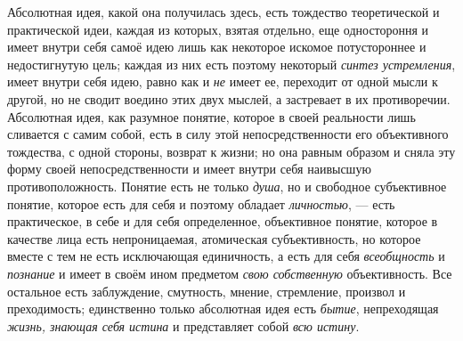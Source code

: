 \documentclass[twoside]{article}
\begin{document}
Абсолютная идея, какой она получилась здесь, есть тождество
теоретической и практической идеи, каждая из которых, взятая отдельно, еще
одностороння и имеет внутри себя самоё идею лишь как некоторое искомое
потустороннее и недостигнутую цель; каждая из них есть поэтому некоторый
{\em синтез устремления},
имеет внутри себя идею, равно как и
{\em не} имеет ее,
переходит от одной мысли к другой, но не сводит воедино этих двух мыслей, а
застревает в их противоречии. Абсолютная идея, как разумное понятие,
которое в своей реальности лишь сливается с самим собой, есть в силу этой
непосредственности его объективного тождества, с одной стороны, возврат к
жизни; но она равным образом и сняла эту форму своей непосредственности и
имеет внутри себя наивысшую противоположность. Понятие есть не только
{\em душа}, но и
свободное субъективное понятие, которое есть для себя и поэтому обладает
{\em личностью}, — есть
практическое, в себе и для себя определенное, объективное понятие, которое
в качестве лица есть непроницаемая, атомическая субъективность, но которое
вместе с тем не есть исключающая единичность, а есть для себя
{\em всеобщность} и
{\em познание} и имеет в
своём ином предметом {\em свою
собственную} объективность. Все остальное есть заблуждение,
смутность, мнение, стремление, произвол и преходимость; единственно только
абсолютная идея есть {\em бытие},
непреходящая {\em жизнь,
знающая себя истина} и представляет собой
{\em всю истину}.
\end{document}
